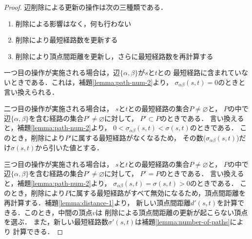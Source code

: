 \begin{proof}
  辺削除による更新の操作は次の三種類である．
  \begin{enumerate}
  \item 削除による影響はなく，何も行わない
  \item 削除により最短経路数を更新する
  \item 削除により頂点間距離を更新し，さらに最短経路数を再計算する
  \end{enumerate}

  一つ目の操作が実施される場合は，辺$\{\alpha,\beta\}$が$s$と$t$との
  最短経路に含まれていないときである．これは，補題\ref{lemma:path-num-2}より，
  $\sigma_{\alpha\beta}(s,t)=0$のときと言い換えられる．

  二つ目の操作が実施される場合は，
  $s$と$t$との最短経路の集合$P\neq\varnothing$と，
  $P$の中で辺$\{\alpha,\beta\}$を含む経路の集合$P'\neq\varnothing$に対して，
  $P'\subset P$のときである．
  言い換えると，補題\ref{lemma:path-num-2}より，
  $0<\sigma_{\alpha\beta}(s,t)<\sigma(s,t)$のときである．
  このとき，削除により$P'$に属する最短経路がなくなるため，
  その数($\sigma_{\alpha\beta}(s,t)$)だけ$\sigma(s,t)$から引いた値とする．

  三つ目の操作が実施される場合は，
  $s$と$t$との最短経路の集合$P\neq\varnothing$と，
  $P$の中で辺$\{\alpha,\beta\}$を含む経路の集合$P'\neq\varnothing$に対して，
  $P'=P$のときである．
  言い換えると，補題\ref{lemma:path-num-2}より，
  $\sigma_{\alpha\beta}(s,t)=\sigma(s,t)>0$のときである．
  このとき，削除により$P$に属する最短経路がすべて無効になるため，頂点間距離を
  再計算する．補題\ref{lemma:distance-1}より，
  新しい頂点間距離$d'(s,t)$を計算できる．このとき，中間の頂点$v$は
  削除による頂点間距離の更新が起こらない頂点を選ぶ．
  また，新しい最短経路数$\sigma'(s,t)$は補題\ref{lemma:number-of-paths}により
  計算できる．
\end{proof}

